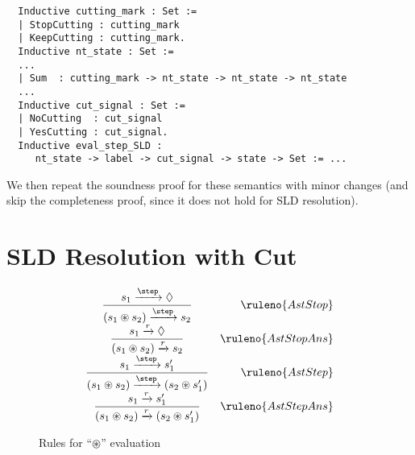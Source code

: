 \begin{lstlisting}
  Inductive cutting_mark : Set :=
  | StopCutting : cutting_mark
  | KeepCutting : cutting_mark.
  Inductive nt_state : Set :=
  ...
  | Sum  : cutting_mark -> nt_state -> nt_state -> nt_state
  ...
  Inductive cut_signal : Set :=
  | NoCutting  : cut_signal
  | YesCutting : cut_signal.
  Inductive eval_step_SLD :
     nt_state -> label -> cut_signal -> state -> Set := ...
\end{lstlisting}

We then repeat the soundness proof for these semantics with minor changes (and skip the completeness proof, since it does not hold for SLD resolution).

\section{SLD Resolution with Cut}
\label{appendix_cut}

\begin{figure*}[t]
\[
  \begin{array}{cr}
    \dfrac{s_1 \xrightarrow{\step} \Diamond}{(s_1 \circledast s_2) \xrightarrow{\step} s_2} & \ruleno{AstStop}\\
    \dfrac{s_1 \xrightarrow{r} \Diamond}{(s_1 \circledast s_2) \xrightarrow{r} s_2} & \ruleno{AstStopAns}\\
    \dfrac{s_1 \xrightarrow{\step} s'_1}{(s_1 \circledast s_2) \xrightarrow{\step} (s_2 \circledast s'_1)} &\ruleno{AstStep}\\
    \dfrac{s_1 \xrightarrow{r} s'_1}{(s_1 \circledast s_2) \xrightarrow{r} (s_2 \circledast s'_1)} &\ruleno{AstStepAns}\\
  \end{array}
\]
\caption{Rules for ``$\circledast$'' evaluation}
\label{asterisk-rules}
\end{figure*}

